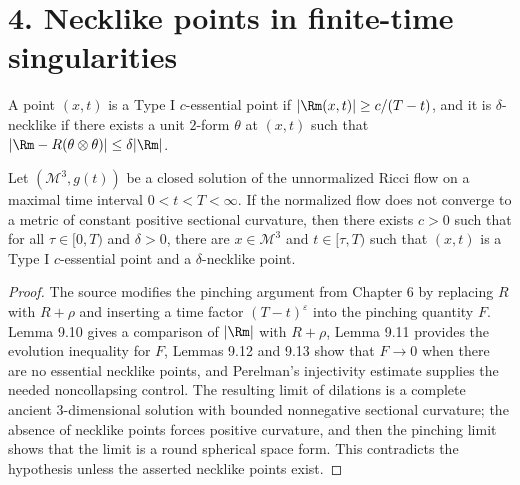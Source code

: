 \section*{4. Necklike points in finite-time singularities}

\begin{definition}
\label{ch09-def-type-i-essential-necklike}
A point \((x,t)\) is a Type I \(c\)-essential point if \(|\Rm(x,t)|\ge c/(T-t)\), and it is \(\delta\)-necklike if there exists a unit \(2\)-form \(\theta\) at \((x,t)\) such that \(|\Rm-R(\theta\otimes\theta)|\le \delta|\Rm|\).
\end{definition}

\begin{theorem}
\label{ch09-thm-necklike-points-finite-time}
Let \((\mathcal M^3,g(t))\) be a closed solution of the unnormalized Ricci flow on a maximal time interval \(0<t<T<\infty\). If the normalized flow does not converge to a metric of constant positive sectional curvature, then there exists \(c>0\) such that for all \(\tau\in[0,T)\) and \(\delta>0\), there are \(x\in\mathcal M^3\) and \(t\in[\tau,T)\) such that \((x,t)\) is a Type I \(c\)-essential point and a \(\delta\)-necklike point.
\end{theorem}

\begin{proof}
\sketch The source modifies the pinching argument from Chapter 6 by replacing \(R\) with \(R+\rho\) and inserting a time factor \((T-t)^\varepsilon\) into the pinching quantity \(F\). Lemma 9.10 gives a comparison of \(|\Rm|\) with \(R+\rho\), Lemma 9.11 provides the evolution inequality for \(F\), Lemmas 9.12 and 9.13 show that \(F\to 0\) when there are no essential necklike points, and Perelman's injectivity estimate supplies the needed noncollapsing control. The resulting limit of dilations is a complete ancient \(3\)-dimensional solution with bounded nonnegative sectional curvature; the absence of necklike points forces positive curvature, and then the pinching limit shows that the limit is a round spherical space form. This contradicts the hypothesis unless the asserted necklike points exist.
\end{proof}

